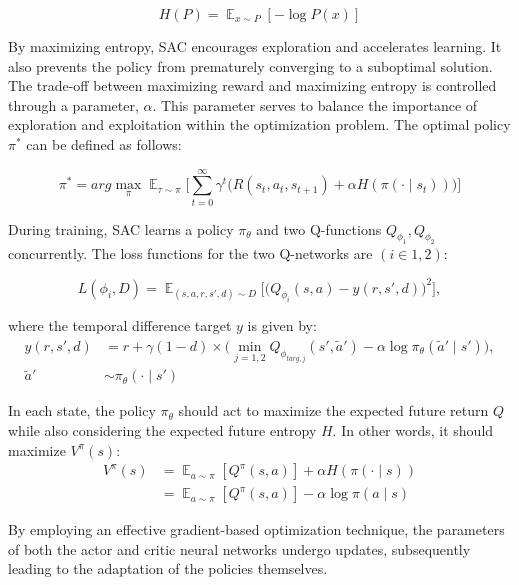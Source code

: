 \begin{equation}
 H(P) = \displaystyle \mathop{\mathbb{E}}_{x \sim P}[-\log P(x)]
\end{equation}

By maximizing entropy, SAC encourages exploration and accelerates learning. It
also prevents the policy from prematurely converging to a suboptimal solution.
The trade-off between maximizing reward and maximizing entropy is controlled
through a parameter, \(\alpha\). This parameter serves to balance the importance
of exploration and exploitation within the optimization problem. The optimal policy
\(\pi^*\) can be defined as follows:

\begin{equation}
 \pi^* = {arg}{\max_{\pi}}{\displaystyle
 \mathop{\mathbb{E}}_{\tau\sim\pi}}{\Bigg[{\sum_{t=0}^{\infty}}{\gamma^{t}}{\Big(R(s_t,a_t,s_{t+1})}+{\alpha}H(\pi(\cdot\mid{s_t}))\Big)\Bigg]}
\end{equation}

During training, SAC learns a policy $\pi_{\theta}$ and two Q-functions
$Q_{\phi_1} , Q_{\phi_2}$ concurrently. The loss functions for the two Q-networks are
$(i \in {1, 2})$:

\begin{equation}
  L(\phi_i,D) = \displaystyle
  \mathop{\mathbb{E}}_{(s,a,r,s',d)\sim{D}}\bigg[\bigg(Q_{\phi_i}(s,a)-y(r,s',d)\bigg)^2\bigg],
\end{equation}

where the temporal difference target \(y\) is given by:
\begin{align}
  y(r,s',d) &= r + \gamma(1-d) \times \nonumber\bigg(\displaystyle
  \mathop{\min}_{j=1,2}Q_{\phi_{targ,j}}(s',\tilde{a}')-\alpha\log
  {\pi_\theta}(\tilde{a}'\mid{s}')\bigg), \\
  \tilde{a}'&\sim{\pi_\theta}(\cdot\mid{s'})
\end{align}

In each state, the policy \(\pi_\theta\) should act to maximize the expected
future return \(Q\) while also considering the expected future entropy \(H\). In other
words, it should maximize \(V^\pi(s)\):
\begin{align}
 V^\pi(s) &= {\displaystyle \mathop{\mathbb{E}}_{a\sim\pi}[Q^\pi(s,a)]} +
 \alpha{H(\pi(\cdot\mid{s}))} \\
 &= {\displaystyle \mathop{\mathbb{E}}_{a\sim\pi}[Q^\pi(s,a)]} -
 \alpha{\log {\pi(a\mid{s})}}
\end{align}


By employing an effective gradient-based optimization technique, the parameters
of both the actor and critic neural networks undergo updates, subsequently
leading to the adaptation of the policies themselves.

